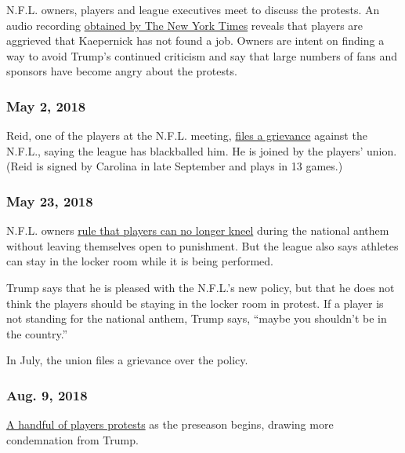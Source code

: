 N.F.L. owners, players and league executives meet to discuss the
protests. An audio recording
\href{https://www.nytimes.com/2018/04/25/sports/nfl-owners-kaepernick.html}{obtained
by The New York Times} reveals that players are aggrieved that
Kaepernick has not found a job. Owners are intent on finding a way to
avoid Trump's continued criticism and say that large numbers of fans and
sponsors have become angry about the protests.

\hypertarget{may-2-2018}{%
\subsubsection{\texorpdfstring{\textbf{May 2,
2018}}{May 2, 2018}}\label{may-2-2018}}

Reid, one of the players at the N.F.L. meeting,
\href{https://www.nytimes.com/2018/05/02/sports/football/eric-reid-grievance.html}{files
a grievance} against the N.F.L., saying the league has blackballed him.
He is joined by the players' union. (Reid is signed by Carolina in late
September and plays in 13 games.)

\hypertarget{may-23-2018}{%
\subsubsection{\texorpdfstring{\textbf{May 23},
\textbf{2018}}{May 23, 2018}}\label{may-23-2018}}

N.F.L. owners
\href{https://www.nytimes.com/2018/05/23/sports/nfl-anthem-kneeling.html}{rule
that players can no longer kneel} during the national anthem without
leaving themselves open to punishment. But the league also says athletes
can stay in the locker room while it is being performed.

Trump says that he is pleased with the N.F.L.'s new policy, but that he
does not think the players should be staying in the locker room in
protest. If a player is not standing for the national anthem, Trump
says, ``maybe you shouldn't be in the country.''

In July, the union files a grievance over the policy.

\hypertarget{aug-9-2018}{%
\subsubsection{\texorpdfstring{\textbf{Aug. 9,
2018}}{Aug. 9, 2018}}\label{aug-9-2018}}

\href{https://www.nytimes.com/2018/08/09/sports/nfl-national-anthem-kneeling-protest.html}{A
handful of players protests} as the preseason begins, drawing more
condemnation from Trump.

